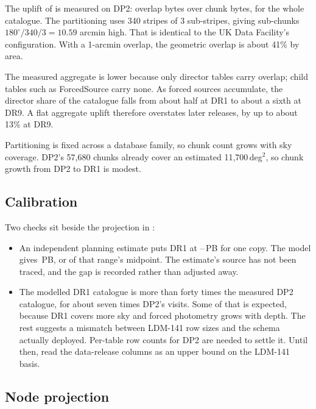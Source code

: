 The uplift of \smQsOverlap{} is measured on DP2: overlap bytes over chunk bytes,
for the whole catalogue. The partitioning uses 340 stripes of 3 sub-stripes,
giving sub-chunks $180^\circ / 340 / 3 = 10.59$ arcmin high. That is identical
to the UK Data Facility's configuration. With a 1-arcmin overlap, the
geometric overlap is about 41\% by area.

The measured aggregate is lower because only director tables carry overlap;
child tables such as ForcedSource carry none. As forced sources accumulate,
the director share of the catalogue falls from about half at DR1 to about a
sixth at DR9. A flat aggregate uplift therefore overstates later releases, by
up to about 13\% at DR9.

Partitioning is fixed across a database family, so chunk count grows with sky
coverage. DP2's 57{,}680 chunks already cover an estimated 11{,}700\,deg$^2$,
so chunk growth from DP2 to DR1 is modest.

\subsection{Calibration}

Two checks sit beside the projection in :

\begin{itemize}
\item An independent planning estimate puts DR1 at
      \smQsPlanLowPB--\smQsPlanHighPB\,PB for one copy. The model gives
      \smQsDRonePerCopyPB\,PB, or \smQsDRoneVsPlan{} of that range's midpoint.
      The estimate's source has not been traced, and the gap is recorded
      rather than adjusted away.
\item The modelled DR1 catalogue is more than forty times the measured DP2
      catalogue, for about seven times DP2's visits. Some of that is
      expected, because DR1 covers more sky and forced photometry grows with
      depth. The rest suggests a mismatch between LDM-141 row sizes and the
      schema actually deployed. Per-table row counts for DP2 are needed to
      settle it. Until then, read the data-release columns as an upper bound on
      the LDM-141 basis.
\end{itemize}

\subsection{Node projection}

